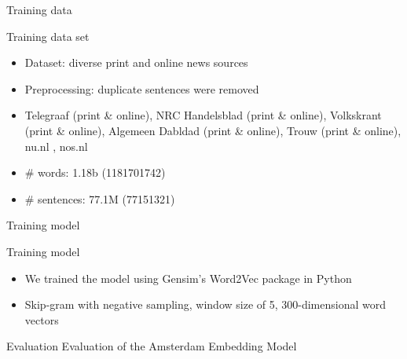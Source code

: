 \documentclass[compress]{beamer}
\begin{document}



\begin{frame}{Training data}
	\begin{block}{Training data set}
		\begin{itemize}
			\item Dataset: diverse print and online news sources
			\item Preprocessing: duplicate sentences were removed
			\item Telegraaf (print \& online), NRC Handelsblad (print \& online), Volkskrant (print \& online), Algemeen Dabldad (print \& online), Trouw (print \& online), nu.nl , nos.nl
			\item \# words: 1.18b (1181701742)
			\item \# sentences: 77.1M (77151321)
		\end{itemize}
	\end{block}
\end{frame}

\begin{frame}{Training model}
	\begin{block}{Training model}
		\begin{itemize}
			\item We trained the model using Gensim's Word2Vec package in Python
			\item Skip-gram with negative sampling, window size of 5, 300-dimensional word vectors
		\end{itemize}
	\end{block}
\end{frame}

\begin{frame}{Evaluation}
	Evaluation of the Amsterdam Embedding Model
\end{frame}
\end{document}
